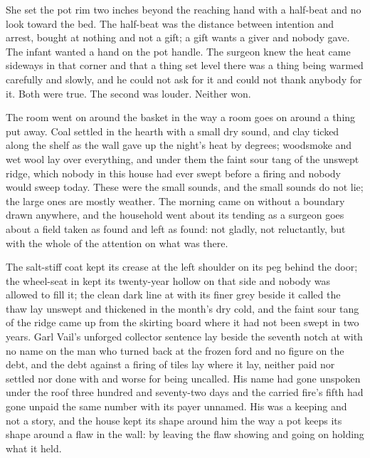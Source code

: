 She set the pot rim two inches beyond the reaching hand with a half-beat and no look toward the bed. The half-beat was the distance between intention and arrest, bought at nothing and not a gift; a gift wants a giver and nobody gave. The infant wanted a hand on the pot handle. The surgeon knew the heat came sideways in that corner and that a thing set level there was a thing being warmed carefully and slowly, and he could not ask for it and could not thank anybody for it. Both were true. The second was louder. Neither won.

The room went on around the basket in the way a room goes on around a thing put away. Coal settled in the hearth with a small dry sound, and clay ticked along the shelf as the wall gave up the night's heat by degrees; woodsmoke and wet wool lay over everything, and under them the faint sour tang of the unswept ridge, which nobody in this house had ever swept before a firing and nobody would sweep today. These were the small sounds, and the small sounds do not lie; the large ones are mostly weather. The morning came on without a boundary drawn anywhere, and the household went about its tending as a surgeon goes about a field taken as found and left as found: not gladly, not reluctantly, but with the whole of the attention on what was there.

\scenebreak

The salt-stiff coat kept its crease at the left shoulder on its peg behind the door; the wheel-seat in  kept its twenty-year hollow on that side and nobody was allowed to fill it; the clean dark line at  with its finer grey beside it called the thaw lay unswept and thickened in the month's dry cold, and the faint sour tang of the  ridge came up from the skirting board where it had not been swept in two years. Garl Vail's unforged collector sentence lay beside the seventh notch at  with no name on the man who turned back at the frozen ford and no figure on the debt, and the debt against a firing of tiles lay where it lay, neither paid nor settled nor done with and worse for being uncalled. His name had gone unspoken under the roof three hundred and seventy-two days and the carried fire's fifth had gone unpaid the same number with its payer unnamed. His was a keeping and not a story, and the house kept its shape around him the way a pot keeps its shape around a flaw in the wall: by leaving the flaw showing and going on holding what it held.


